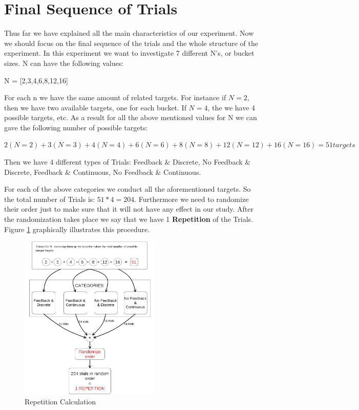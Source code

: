 \section{Final Sequence of Trials}
\label{sec:FinalSequenceofTrials}


Thus far we have explained all the main characteristics of our experiment. Now we should focus on the final sequence of the trials and the whole structure of the experiment. In this experiment we want to investigate 7 different N's, or bucket sizes. N can have the following values:

N = [2,3,4,6,8,12,16]

For each n we have the same amount of related targets. For instance if $N=2$, then we have two available targets, one for each bucket. If $N=4$, the we have 4 possible targets, etc.
As a result for all the above mentioned values for N we can gave the following number of possible targets:

$2(N=2)+3(N=3)+4(N=4)+6(N=6)+8(N=8)+12(N=12)+16(N=16) = 51 targets$

Then we have 4 different types of Trials: Feedback \& Discrete, No Feedback \& Discrete, Feedback \& Continuous, No Feedback \& Continuous.

For each of the above categories we conduct all the aforementioned targets. So the total number of Trials is:
$51*4 = 204$. Furthermore we need to randomize their order just to make sure that it will not have any effect in our study. After the randomization takes place we say that we have 1 \textbf{Repetition} of the Trials. Figure \ref{fig:ffRepetition} graphically illustrates this procedure.


\begin{figure}[H]
\centering
\includegraphics[width=0.6\textwidth]{figures/repetition.png}
\caption{Repetition Calculation}
\label{fig:ffRepetition}
\end{figure}


